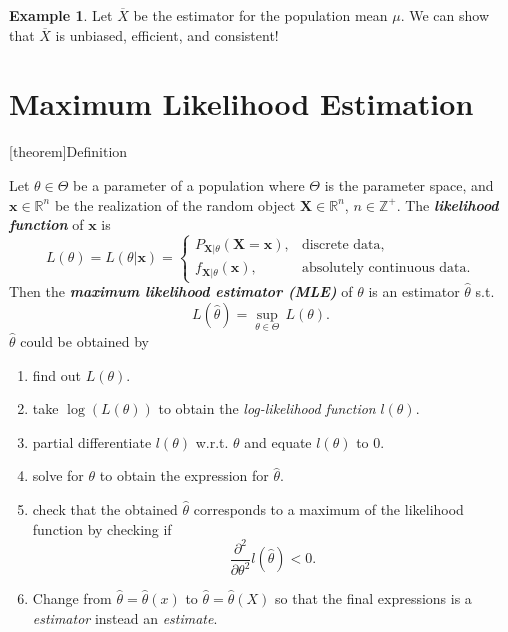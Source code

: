 \documentclass[12pt]{report}
\theoremstyle{definition}
\begin{document}
\newtheorem{xbar is a "good" estimator}[theorem]{Example}
\begin{xbar is a "good" estimator}
    Let $\overline{X}$ be the estimator for the population mean $\mu$.
    We can show that $\overline{X}$ is unbiased, efficient, and consistent!
\end{xbar is a "good" estimator}

\section{Maximum Likelihood Estimation}

[theorem]{Definition}
\begin{MLE}
    Let $\theta\in\Theta$ be a parameter of a population where $\Theta$ is the
    parameter space, and $\mathbf{x}\in\mathbb{R}^{n}$ be the realization of
    the random object $\mathbf{X}\in\mathbb{R}^{n}$, $n\in\mathbb{Z}^+$.
    The \textbf{\emph{likelihood function}} of $\mathbf{x}$ is
    \[
        L(\theta)=L(\theta|\mathbf{x})=
        \begin{cases}
            P_{\mathbf{X}|\theta}(\mathbf{X}=\mathbf{x}), & \text{discrete data}, \\
            f_{\mathbf{X}|\theta}(\mathbf{x}), & \text{absolutely continuous data}.
        \end{cases} 
    \]
    Then the \textbf{\emph{maximum likelihood estimator (MLE)}} of $\theta$ is
    an estimator $\hat{\theta}$ s.t.
    \[
        L(\hat{\theta})=\underset{\theta\in\Theta}{\sup}\,L(\theta).
    \]
    $\hat{\theta}$ could be obtained by
    \begin{enumerate}
        \item find out $L(\theta)$.
        \item take $\log(L(\theta))$ to obtain the \emph{log-likelihood function}
            $l(\theta)$.
        \item partial differentiate $l(\theta)$ w.r.t. $\theta$ 
            and equate $l(\theta)$ to 0.
        \item solve for $\theta$ to obtain the expression for $\hat{\theta}$.
        \item check that the obtained $\hat{\theta}$ corresponds to a maximum of
            the likelihood function by checking if
            \[
                \frac{\partial^2}{\partial \theta^2}l(\hat{\theta})<0.
            \]
        \item Change from $\hat{\theta}=\hat{\theta}(x)$
            to $\hat{\theta}=\hat{\theta}(X)$ so that the final expressions is
            a \emph{estimator} instead an \emph{estimate}.
    \end{enumerate} 
\end{MLE}
\end{document}
